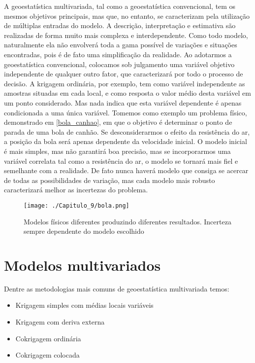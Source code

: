 A geoestatística multivariada, tal como a geoestatística convencional, tem os mesmos objetivos principais, mas que, no entanto, se caracterizam pela utilização de múltiplas entradas do modelo. A descrição, interpretação e estimativa são realizadas de forma muito mais complexa e interdependente.  
Como todo modelo, naturalmente ela não envolverá toda a gama possível de variações e situações encontradas, pois é de fato uma simplificação da realidade. Ao adotarmos a geoestatística convencional, colocamos sob julgamento uma variável objetivo independente de qualquer outro fator,  que caracterizará por todo o processo de decisão.  A krigagem ordinária, por exemplo, tem como variável independente as amostras situadas em cada local, e como resposta o valor médio desta variável em um ponto considerado. Mas nada indica que esta variável dependente é apenas condicionada a uma única variável.  Tomemos como exemplo um problema físico, demonstrado em \eqref{bola_canhao}, em que o objetivo é determinar o ponto de parada de uma bola de canhão. Se desconsiderarmos o efeito da resistência do ar, a posição da bola será apenas dependente da velocidade inicial. O modelo inicial é mais simples, mas não garantirá boa precisão, mas se incorporarmos uma variável correlata tal como a resistência do ar, o modelo se tornará mais fiel e semelhante com a realidade. De fato nunca haverá modelo que consiga se acercar de todas as possibilidades de variação, mas cada modelo mais robusto caracterizará melhor as incertezas do problema. 
 
\begin{figure}[H]
	\centering
	\texttt{[image: ./Capitulo\_9/bola.png]}	
	\caption{Modelos físicos diferentes produzindo diferentes resultados. Incerteza sempre dependente do modelo escolhido}
	\label{bola_canhao}
\end{figure}

\section{Modelos multivariados}

Dentre as metodologias mais comuns de geoestatística multivariada temos:

\begin{itemize}
	\item Krigagem simples com médias locais variáveis 
	\item Krigagem com deriva externa 
	\item Cokrigagem ordinária 
	\item Cokrigagem colocada
\end{itemize}

